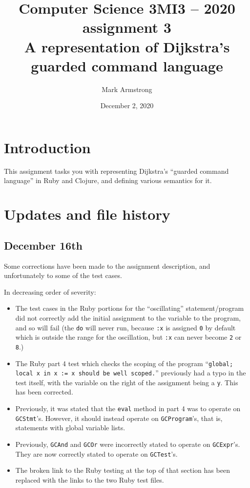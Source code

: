 \documentclass[11pt]{article}
\author{Mark Armstrong}
\date{December 2, 2020}
\title{Computer Science 3MI3 – 2020 assignment 3\\\medskip
\large A representation of Dijkstra's guarded command language}
\theoremstyle{definition}
\begin{document}
\maketitle
\tableofcontents


\section*{Introduction}
\label{sec:orga467fa5}
This assignment tasks you with representing
Dijkstra's “guarded command language” in
Ruby and Clojure,
and defining various semantics for it.

\section*{Updates and file history}
\label{sec:org36786f1}
\subsection*{December 16th}
\label{sec:org2133532}
Some corrections have been made to the assignment description,
and unfortunately to some of the test cases.

In decreasing order of severity:
\begin{itemize}
\item The test cases in the Ruby portions for the “oscillating” statement/program
did not correctly add the initial assignment to the variable
to the program, and so will fail (the \texttt{do} will never run,
because \texttt{:x} is assigned \texttt{0} by default which is outside the
range for the oscillation, but \texttt{:x} can never become \texttt{2} or \texttt{8}.)
\item The Ruby part 4 test which checks the scoping of the program
“\texttt{global; local x in x := x should be well scoped.}”
previously had a typo in the test itself,
with the variable on the right of the assignment being a \texttt{y}.
This has been corrected.
\item Previously, it was stated that the \texttt{eval} method in part 4
was to operate on \texttt{GCStmt}'s. However, it should instead
operate on \texttt{GCProgram}'s, that is, statements with global variable lists.
\item Previously, \texttt{GCAnd} and \texttt{GCOr} were incorrectly stated
to operate on \texttt{GCExpr}'s. They are now correctly stated to operate
on \texttt{GCTest}'s.
\item The broken link to the Ruby testing at the top of that section
has been replaced with the links to the two Ruby test files.
\end{itemize}
\end{document}
